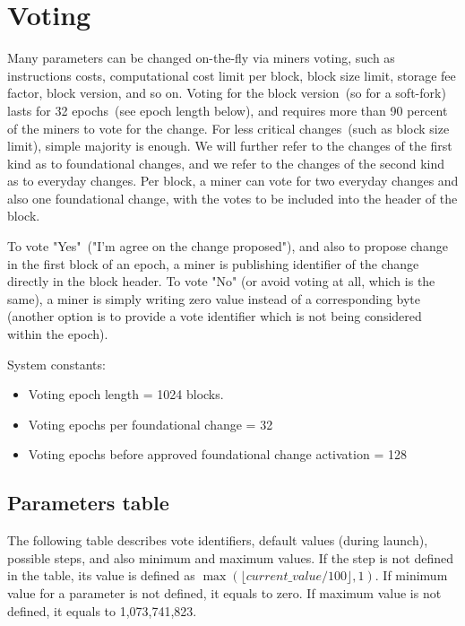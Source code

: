 \section{Voting}

Many parameters can be changed on-the-fly via miners voting, such as instructions costs, computational cost limit per block,
block size limit, storage fee factor, block version, and so on. Voting for the block version~(so for a soft-fork)
lasts for 32 epochs~(see epoch length below), and requires more than 90 percent of the miners to vote for the change.
For less critical changes~(such as block size limit), simple majority is enough. We will further refer to the changes
of the first kind as to foundational changes, and we refer to the changes of the second kind as to everyday changes.
Per block, a miner can vote for two everyday changes and also one foundational change, with the votes to be included
into the header of the block.

To vote "Yes"~("I'm agree on the change proposed"), and also to propose change in the first block of an epoch, a miner
is publishing identifier of the change directly in the block header. To vote "No" (or avoid voting at all, which is
the same), a miner is simply writing zero value instead of a corresponding byte (another option is to provide a vote
identifier which is not being considered within the epoch).

System constants:
\begin{itemize}
\item{} Voting epoch length = 1024 blocks.
\item{} Voting epochs per foundational change = 32
\item{} Voting epochs before approved foundational change activation = 128
\end{itemize}

\subsection{Parameters table}
\label{sec:params-table}

The following table describes vote identifiers, default values (during launch), possible steps, and also minimum and maximum values.
If the step is not defined in the table, its value is defined as $\max(\lfloor current\_value / 100 \rfloor, 1)$.
If minimum value for a parameter is not defined, it equals to zero. If maximum value is not defined, it equals to
1,073,741,823.

